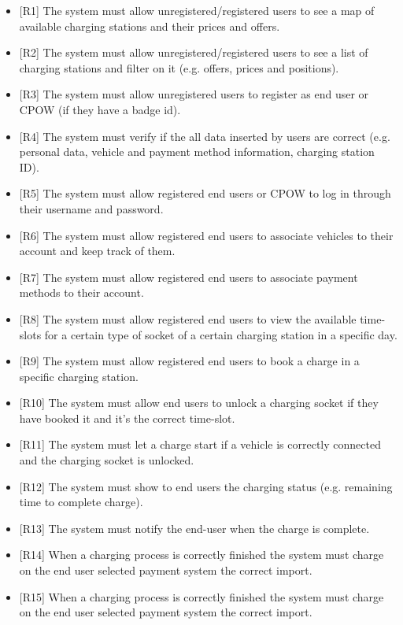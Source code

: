 \documentclass[a4paper]{report}
\begin{document}
\begin{itemize}
    \item{[R1]} \label{R1} The system must allow unregistered/registered users to see a map of available charging stations and their prices and offers.
    \item{[R2]} \label{R2} The system must allow unregistered/registered users to see a list of charging stations and filter on it (e.g. offers, prices and positions).
    \item{[R3]} \label{R3} The system must allow unregistered users to register as end user or CPOW (if they have a badge id).
    \item{[R4]} \label{R4} The system must verify if the all data inserted by users are correct (e.g. personal data, vehicle and payment method information, charging station ID).   
    \item{[R5]} \label{R5} The system must allow registered end users or CPOW to log in through their username and password.
    \item{[R6]} \label{R6} The system must allow registered end users to associate vehicles to their account and keep track of them.
    \item{[R7]} \label{R7} The system must allow registered end users to associate payment methods to their account.
    \item{[R8]} \label{R8} The system must allow registered end users to view the available time-slots for a certain type of socket of a certain charging station in a specific day.
    \item{[R9]} \label{R9} The system must allow registered end users to book a charge in a specific charging station.
    \item{[R10]} \label{R10} The system must allow end users to unlock a charging socket if they have booked it and it's the correct time-slot.
    \item{[R11]} \label{R11} The system must let a charge start if a vehicle is correctly connected and the charging socket is unlocked.
    \item{[R12]} \label{R12} The system must show to end users the charging status (e.g. remaining time to complete charge).
    \item{[R13]} \label{R13} The system must notify the end-user when the charge is complete.
    \item{[R14]} \label{R14} When a charging process is correctly finished the system must charge on the end user selected payment system the correct import.
    \item{[R15]} \label{R15} When a charging process is correctly finished the system must charge on the end user selected payment system the correct import.

\end{itemize}
\end{document}
